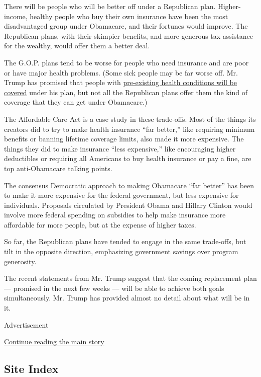There will be people who will be better off under a Republican plan.
Higher-income, healthy people who buy their own insurance have been the
most disadvantaged group under Obamacare, and their fortunes would
improve. The Republican plans, with their skimpier benefits, and more
generous tax assistance for the wealthy, would offer them a better deal.

The G.O.P. plans tend to be worse for people who need insurance and are
poor or have major health problems. (Some sick people may be far worse
off. Mr. Trump has promised that people with
\href{https://www.nytimes.com/2016/11/15/upshot/why-keeping-only-the-popular-parts-of-obamacare-wont-work.html}{pre-existing
health conditions will be covered} under his plan, but not all the
Republican plans offer them the kind of coverage that they can get under
Obamacare.)

The Affordable Care Act is a case study in these trade-offs. Most of the
things its creators did to try to make health insurance ``far better,''
like requiring minimum benefits or banning lifetime coverage limits,
also made it more expensive. The things they did to make insurance
``less expensive,'' like encouraging higher deductibles or requiring all
Americans to buy health insurance or pay a fine, are top anti-Obamacare
talking points.

The consensus Democratic approach to making Obamacare ``far better'' has
been to make it more expensive for the federal government, but less
expensive for individuals. Proposals circulated by President Obama and
Hillary Clinton would involve more federal spending on subsidies to help
make insurance more affordable for more people, but at the expense of
higher taxes.

So far, the Republican plans have tended to engage in the same
trade-offs, but tilt in the opposite direction, emphasizing government
savings over program generosity.

The recent statements from Mr. Trump suggest that the coming replacement
plan --- promised in the next few weeks --- will be able to achieve both
goals simultaneously. Mr. Trump has provided almost no detail about what
will be in it.

Advertisement

\protect\hyperlink{after-bottom}{Continue reading the main story}

\hypertarget{site-index}{%
\subsection{Site Index}\label{site-index}}

